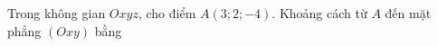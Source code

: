 \begin{ex}
Trong không gian $Oxyz$, cho điểm $A(3;2;-4)$. Khoảng cách từ $A$ đến mặt phẳng $(Oxy)$ bằng
\end{ex}

